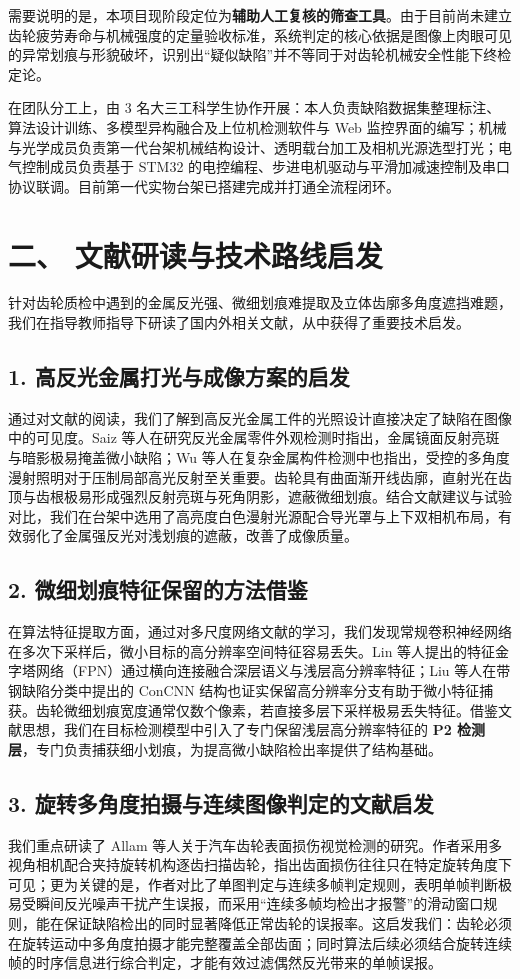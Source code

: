 需要说明的是，本项目现阶段定位为\textbf{辅助人工复核的筛查工具}。由于目前尚未建立齿轮疲劳寿命与机械强度的定量验收标准，系统判定的核心依据是图像上肉眼可见的异常划痕与形貌破坏，识别出“疑似缺陷”并不等同于对齿轮机械安全性能下终检定论。

在团队分工上，由 3 名大三工科学生协作开展：本人负责缺陷数据集整理标注、算法设计训练、多模型异构融合及上位机检测软件与 Web 监控界面的编写；机械与光学成员负责第一代台架机械结构设计、透明载台加工及相机光源选型打光；电气控制成员负责基于 STM32 的电控编程、步进电机驱动与平滑加减速控制及串口协议联调。目前第一代实物台架已搭建完成并打通全流程闭环。

\section*{二、 文献研读与技术路线启发}

针对齿轮质检中遇到的金属反光强、微细划痕难提取及立体齿廓多角度遮挡难题，我们在指导教师指导下研读了国内外相关文献，从中获得了重要技术启发。

\subsection*{1. 高反光金属打光与成像方案的启发}
通过对文献的阅读，我们了解到高反光金属工件的光照设计直接决定了缺陷在图像中的可见度。Saiz 等人在研究反光金属零件外观检测时指出，金属镜面反射亮斑与暗影极易掩盖微小缺陷；Wu 等人在复杂金属构件检测中也指出，受控的多角度漫射照明对于压制局部高光反射至关重要。齿轮具有曲面渐开线齿廓，直射光在齿顶与齿根极易形成强烈反射亮斑与死角阴影，遮蔽微细划痕。结合文献建议与试验对比，我们在台架中选用了高亮度白色漫射光源配合导光罩与上下双相机布局，有效弱化了金属强反光对浅划痕的遮蔽，改善了成像质量。

\subsection*{2. 微细划痕特征保留的方法借鉴}
在算法特征提取方面，通过对多尺度网络文献的学习，我们发现常规卷积神经网络在多次下采样后，微小目标的高分辨率空间特征容易丢失。Lin 等人提出的特征金字塔网络（FPN）通过横向连接融合深层语义与浅层高分辨率特征；Liu 等人在带钢缺陷分类中提出的 ConCNN 结构也证实保留高分辨率分支有助于微小特征捕获。齿轮微细划痕宽度通常仅数个像素，若直接多层下采样极易丢失特征。借鉴文献思想，我们在目标检测模型中引入了专门保留浅层高分辨率特征的 \textbf{P2 检测层}，专门负责捕获细小划痕，为提高微小缺陷检出率提供了结构基础。

\subsection*{3. 旋转多角度拍摄与连续图像判定的文献启发}
我们重点研读了 Allam 等人关于汽车齿轮表面损伤视觉检测的研究。作者采用多视角相机配合夹持旋转机构逐齿扫描齿轮，指出齿面损伤往往只在特定旋转角度下可见；更为关键的是，作者对比了单图判定与连续多帧判定规则，表明单帧判断极易受瞬间反光噪声干扰产生误报，而采用“连续多帧均检出才报警”的滑动窗口规则，能在保证缺陷检出的同时显著降低正常齿轮的误报率。这启发我们：齿轮必须在旋转运动中多角度拍摄才能完整覆盖全部齿面；同时算法后续必须结合旋转连续帧的时序信息进行综合判定，才能有效过滤偶然反光带来的单帧误报。

